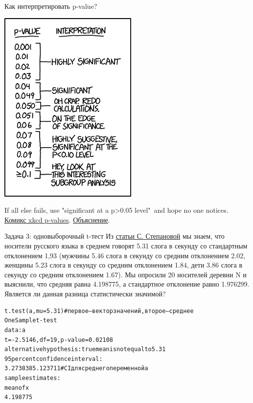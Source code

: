 \begin{frame}{Как интерпретировать p-value?}
\begin{center}
\includegraphics[width=0.45\linewidth]{ifall.png}
\end{center}
\vspace{-5mm}
If all else fails, use "significant at a p>0.05 level"\ and hope no one notices.
\\
\href{https://xkcd.com/1478/}{\alert{Комикс xkcd p-values}}. \href{http://www.explainxkcd.com/wiki/index.php/P-Values}{\alert{Объяснение}}.
\end{frame}
\begin{frame}{Задача 3: одновыборочный t-тест}
Из \href{https://www.internationalphoneticassociation.org/icphs-proceedings/ICPhS2011/OnlineProceedings/RegularSession/Stepanova/Stepanova.pdf}{\alert{статьи С. Степановой}} мы знаем, что носители русского языка в среднем говорят 5.31 слога в секунду со стандартным отклонением 1,93 (мужчины 5.46 слога в секунду  со средним отклонением 2.02, женщины 5.23 слога в секунду  со средним отклонением 1.84, дети 3.86 слога в секунду со средним отклонением 1.67). Мы опросили 20 носителей деревни N и выяснили, что средняя равна 4.198775, а стандартное отклонение равно 1.976299. Является ли данная разница статистически значимой?
\vfill
\scriptsize
\begin{alltt}
\alert{t.test(a, mu = 5.31)} \hfill \# первое — вектор значений, второе — среднее\medskip\\
One Sample t-test\\
data:  a\\
\alert{t = -2.5146, df = 19, p-value = 0.02108}\\
alternative hypothesis: true mean is not equal to 5.31\\
95 percent confidence interval:\\
 3.273838 5.123711 \hfill \# CI для среднего переменной a\\
sample estimates:\\
mean of x \\
 4.198775 
\end{alltt}
\normalsize
\end{frame}
